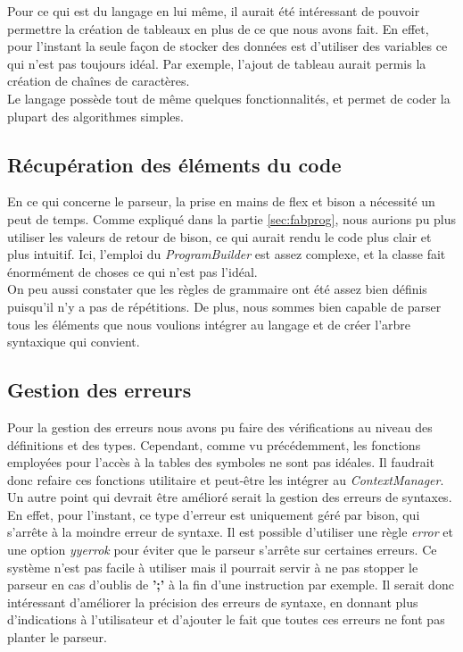 \documentclass[a4paper]{article}%
\begin{document}
Pour ce qui est du langage en lui même, il aurait été intéressant de pouvoir
permettre la création de tableaux en plus de ce que nous avons fait. En effet,
pour l'instant la seule façon de stocker des données est d'utiliser des
variables ce qui n'est pas toujours idéal. Par exemple, l'ajout de tableau
aurait permis la création de chaînes de caractères.\\

Le langage possède tout de même quelques fonctionnalités, et permet de coder la
plupart des algorithmes simples.

\subsection{Récupération des éléments du code}

En ce qui concerne le parseur, la prise en mains de flex et bison a nécessité un
peut de temps. Comme expliqué dans la partie \ref{sec:fabprog}, nous aurions pu
plus utiliser les valeurs de retour de bison, ce qui aurait rendu le code plus
clair et plus intuitif. Ici, l'emploi du \textit{ProgramBuilder} est assez
complexe, et la classe fait énormément de choses ce qui n'est pas l'idéal.\\

On peu aussi constater que les règles de grammaire ont été assez bien définis
puisqu'il n'y a pas de répétitions. De plus, nous sommes bien capable de parser
tous les éléments que nous voulions intégrer au langage et de créer l'arbre
syntaxique qui convient.

\subsection{Gestion des erreurs}

Pour la gestion des erreurs nous avons pu faire des vérifications au niveau des
définitions et des types. Cependant, comme vu précédemment, les fonctions
employées pour l'accès à la tables des symboles ne sont pas idéales. Il faudrait
donc refaire ces fonctions utilitaire et peut-être les intégrer au
\textit{ContextManager}.\\

Un autre point qui devrait être amélioré serait la gestion des erreurs de
syntaxes. En effet, pour l'instant, ce type d'erreur est uniquement géré par
bison, qui s'arrête à la moindre erreur de syntaxe. Il est possible d'utiliser
une règle \textit{error} et une option \textit{yyerrok} pour éviter que le
parseur s'arrête sur certaines erreurs. Ce système n'est pas facile à utiliser
mais il pourrait servir à ne pas stopper le parseur en cas d'oublis de
\textbf{';'} à la fin d'une instruction par exemple. Il serait donc intéressant
d'améliorer la précision des erreurs de syntaxe, en donnant plus d'indications à
l'utilisateur et d'ajouter le fait que toutes ces erreurs ne font pas planter le
parseur.\\
\end{document}
